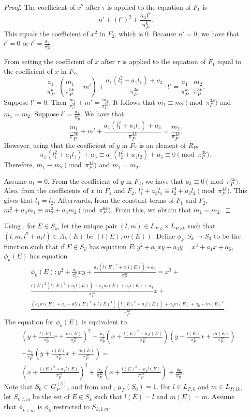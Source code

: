 \documentclass[12pt,letterpaper]{amsart}
\theoremstyle{definition}
\begin{document}
\begin{proof}
The coefficient of $x^2$ after $\tau$ is applied to the equation of $F_1$ is
\[
n'+(l')^2+\frac{a_1l'}{\pi_P^k}.
\]
This equals the coefficient of $x^2$ in $F_2$, which is $0$. Because $n'=0$, we have that $l'=0$ or $l'=\frac{a_1}{\pi_P^k}$.

From setting the coefficient of $x$ after $\tau$ is applied to the equation of $F_1$ equal to the coefficient of $x$ in $F_2$,
\[
\frac{a_1}{\pi_P^k}\cdot\left(\frac{m_1}{\pi_P^{3k}}+m'\right)+\frac{a_1(l_1^2+a_1l_1)+a_3}{\pi_P^{3k}}\cdot l'=\frac{a_1}{\pi_P^k}\cdot\frac{m_2}{\pi_P^{3k}}.
\]
Suppose $l'=0$. Then $\frac{m_1}{\pi_P^{3k}}+m'=\frac{m_2}{\pi_P^{3k}}$. It follows that $m_1\equiv m_2\pmod{\pi_P^{3k}}$ and $m_1=m_2$. Suppose $l'=\frac{a_1}{\pi_P^k}$. We have that
\[
\frac{m_1}{\pi_P^{3k}}+m'+\frac{a_1(l_1^2+a_1l_1)+a_3}{\pi_P^{3k}}=\frac{m_2}{\pi_P^{3k}}.
\]
However, using that the coefficient of $y$ in $F_2$ is an element of $R_P$,
\[
a_1(l_1^2+a_1l_1)+a_3\equiv a_1(l_2^2+a_1l_2)+a_3\equiv 0\pmod{\pi_P^{3k}}.
\]
Therefore, $m_1\equiv m_2\pmod{\pi_P^{3k}}$ and $m_1=m_2$.

Assume $a_1=0$. From the coefficient of $y$ in $F_2$, we have that $a_3\equiv 0\pmod{\pi_P^{3k}}$. Also, from the coefficients of $x$ in $F_1$ and $F_2$,
$l_1^4+a_3l_1\equiv l_2^4+a_3l_2\pmod{\pi_P^{4k}}$.
This gives that $l_1=l_2$. Afterwards, from the constant terms of $F_1$ and $F_2$, $m_1^2+a_3m_1\equiv m_2^2+a_3m_2\pmod{\pi_P^{6k}}$. From this, we obtain that $m_1=m_2$.
\end{proof}

Using , for $E\in S_k$, let the unique pair $(l,m)\in L_{P,k}\times L_{P,3k}$ such that $(l,m,l^2+a_1l)\in A_k(E)$ be $(l(E), m(E))$. Define $\phi_k: S_k\rightarrow S_0$ to be the function such that if $E\in S_k$ has equation $E:y^2+a_1xy+a_3y=x^3+a_4x+a_6$, $\phi_k(E)$ has equation
\begin{align*}
& \phi_k(E): y^2+\frac{a_1}{\pi_P^k}xy+\frac{a_1(l(E)^2+a_1l(E))+a_3}{\pi_P^{3k}} = x^3+\\
& \frac{l(E)^2(l(E)^2+a_1l(E))+a_1m(E)+a_3l(E)+a_4}{\pi_P^{4k}}x + \\
& \frac{(a_1m(E)+a_4+a_1^2l(E)^2+l(E)^4)(l(E)^2+a_1l(E))+a_3m(E)+a_6+m(E)^2}{\pi_P^{6k}}.
\end{align*}
The equation for $\phi_k(E)$ is equivalent to
\begin{align*}
& \left(y+\frac{l(E)}{\pi_P^k}x+\frac{m(E)}{\pi_P^{3k}}\right)^2+\frac{a_1}{\pi_P^k}\left(x+\frac{l(E)^2+a_1l(E)}{\pi_P^{2k}}\right)\left(y+\frac{l(E)}{\pi_P^k}x+\frac{m(E)}{\pi_P^{3k}}\right) \\ & +\frac{a_3}{\pi_P^{3k}}\left(y+\frac{l(E)}{\pi_P^k}x+\frac{m(E)}{\pi_P^{3k}}\right) = \\
& \left(x+\frac{l(E)^2+a_1l(E)}{\pi_P^{2k}}\right)^3+\frac{a_4}{\pi_P^{4k}}\left(x+\frac{l(E)^2+a_1l(E)}{\pi_P^{2k}}\right)+\frac{a_6}{\pi_P^{6k}}.
\end{align*}
Note that $S_0\subset G_P^{(3)}$, and from  and , $\mu_P(S_0)=1$.  For $l\in L_{P, k}$ and $m\in L_{P, 3k}$, let $S_{k,l,m}$ be the set of $E\in S_k$ such that $l(E)=l$ and $m(E)=m$. Assume that $\phi_{k,l,m}$ is $\phi_k$ restricted to $S_{k,l,m}$.
\end{document}
